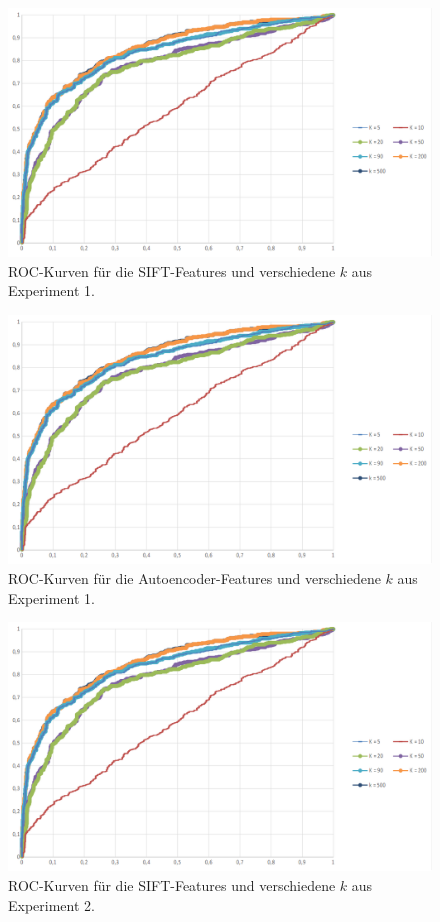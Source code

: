 \begin{figure}
	\centering
	\includegraphics[scale=0.7]{images/roc_ph.png}
	\caption{ROC-Kurven für die SIFT-Features und verschiedene $k$ aus Experiment 1.}
	\label{img:roc1}
\end{figure}

\begin{figure}
	\centering
	\includegraphics[scale=0.7]{images/roc_ph.png}
	\caption{ROC-Kurven für die Autoencoder-Features und verschiedene $k$ aus Experiment 1.}
	\label{img:roc2}
\end{figure}

\begin{figure}
	\centering
	\includegraphics[scale=0.7]{images/roc_ph.png}
	\caption{ROC-Kurven für die SIFT-Features und verschiedene $k$ aus Experiment 2.}
	\label{img:roc3}
\end{figure}

